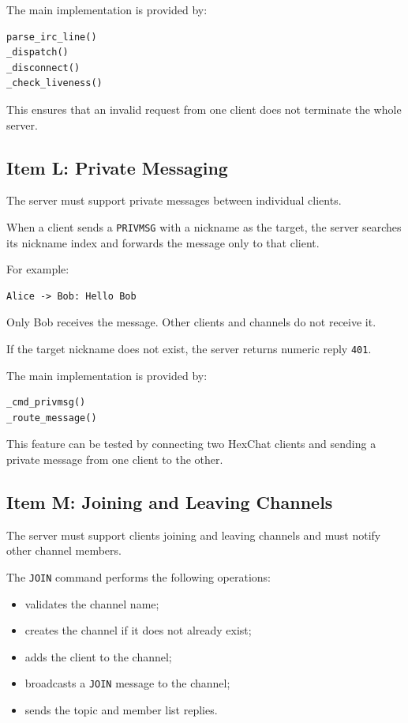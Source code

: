 \documentclass[a4paper,12pt]{article}
\begin{document}
The main implementation is provided by:

\begin{lstlisting}[language=Python]
parse_irc_line()
_dispatch()
_disconnect()
_check_liveness()
\end{lstlisting}

This ensures that an invalid request from one client does not terminate the whole server.

\subsection{Item L: Private Messaging}

The server must support private messages between individual clients.

When a client sends a \texttt{PRIVMSG} with a nickname as the target, the server searches its nickname index and forwards the message only to that client.

For example:

\begin{verbatim}
Alice -> Bob: Hello Bob
\end{verbatim}

Only Bob receives the message. Other clients and channels do not receive it.

If the target nickname does not exist, the server returns numeric reply \texttt{401}.

The main implementation is provided by:

\begin{lstlisting}[language=Python]
_cmd_privmsg()
_route_message()
\end{lstlisting}

This feature can be tested by connecting two HexChat clients and sending a private message from one client to the other.

\subsection{Item M: Joining and Leaving Channels}

The server must support clients joining and leaving channels and must notify other channel members.

The \texttt{JOIN} command performs the following operations:

\begin{itemize}
    \item validates the channel name;
    \item creates the channel if it does not already exist;
    \item adds the client to the channel;
    \item broadcasts a \texttt{JOIN} message to the channel;
    \item sends the topic and member list replies.
\end{itemize}
\end{document}
